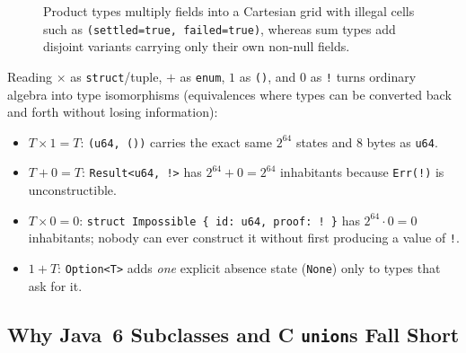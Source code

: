 \begin{figure}[H]
\caption{Product types multiply fields into a Cartesian grid with illegal cells such as \texttt{(settled=true, failed=true)}, whereas sum types add disjoint variants carrying only their own non-null fields.}
\label{ch05:fig-product-vs-sum}
\end{figure}

\begin{intuitionbox}
Reading $\times$ as \texttt{struct}/tuple, $+$ as \texttt{enum}, $1$ as \texttt{()}, and $0$ as \texttt{!} turns ordinary algebra into type isomorphisms (equivalences where types can be converted back and forth without losing information):
\begin{itemize}
  \item $T \times 1 = T$: \texttt{(u64, ())} carries the exact same $2^{64}$ states and 8 bytes as \texttt{u64}.
  \item $T + 0 = T$: \texttt{Result<u64, !>} has $2^{64} + 0 = 2^{64}$ inhabitants because \texttt{Err(!)} is unconstructible.
  \item $T \times 0 = 0$: \texttt{struct Impossible \{ id: u64, proof: ! \}} has $2^{64} \cdot 0 = 0$ inhabitants; nobody can ever construct it without first producing a value of \texttt{!}.
  \item $1 + T$: \texttt{Option<T>} adds \emph{one} explicit absence state (\texttt{None}) only to types that ask for it.
\end{itemize}
\end{intuitionbox}

\subsection{Why Java~6 Subclasses and C \texttt{union}s Fall Short}
\label{ch05:java-c-contrast}


